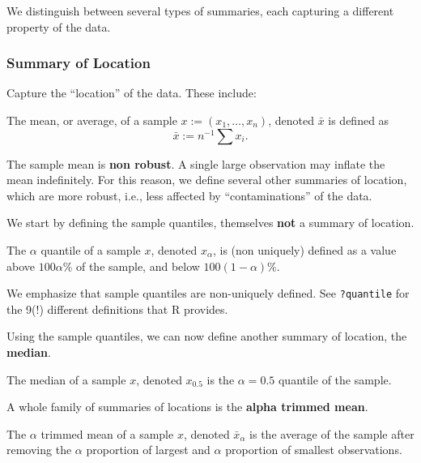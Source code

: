 \documentclass[]{book}
\theoremstyle{definition}
\theoremstyle{definition}
\theoremstyle{definition}
\theoremstyle{remark}
\let\BeginKnitrBlock\begin \let\EndKnitrBlock\end
\begin{document}
We distinguish between several types of summaries, each capturing a
different property of the data.

\subsubsection{Summary of Location}\label{summary-of-location}

Capture the ``location'' of the data. These include:

\BeginKnitrBlock{definition}[Average]
\protect\hypertarget{def:unnamed-chunk-115}{}{\label{def:unnamed-chunk-115}
{} }The mean, or average, of a sample
\(x:=(x_1,\dots,x_n)\), denoted \(\bar x\) is defined as
\[ \bar x := n^{-1} \sum x_i. \]
\EndKnitrBlock{definition}

The sample mean is \textbf{non robust}. A single large observation may
inflate the mean indefinitely. For this reason, we define several other
summaries of location, which are more robust, i.e., less affected by
``contaminations'' of the data.

We start by defining the sample quantiles, themselves \textbf{not} a
summary of location.

\BeginKnitrBlock{definition}[Quantiles]
\protect\hypertarget{def:unnamed-chunk-116}{}{\label{def:unnamed-chunk-116}
{} }The \(\alpha\) quantile of a sample \(x\),
denoted \(x_\alpha\), is (non uniquely) defined as a value above
\(100 \alpha \%\) of the sample, and below \(100 (1-\alpha) \%\).
\EndKnitrBlock{definition}

We emphasize that sample quantiles are non-uniquely defined. See
\texttt{?quantile} for the 9(!) different definitions that R provides.

Using the sample quantiles, we can now define another summary of
location, the \textbf{median}.

\BeginKnitrBlock{definition}[Median]
\protect\hypertarget{def:unnamed-chunk-117}{}{\label{def:unnamed-chunk-117}
{} }The median of a sample \(x\), denoted
\(x_{0.5}\) is the \(\alpha=0.5\) quantile of the sample.
\EndKnitrBlock{definition}

A whole family of summaries of locations is the \textbf{alpha trimmed
mean}.

\BeginKnitrBlock{definition}[Alpha Trimmed Mean]
\protect\hypertarget{def:unnamed-chunk-118}{}{\label{def:unnamed-chunk-118}
{} }The \(\alpha\) trimmed mean of a
sample \(x\), denoted \(\bar x_\alpha\) is the average of the sample
after removing the \(\alpha\) proportion of largest and \(\alpha\)
proportion of smallest observations.
\EndKnitrBlock{definition}
\end{document}
